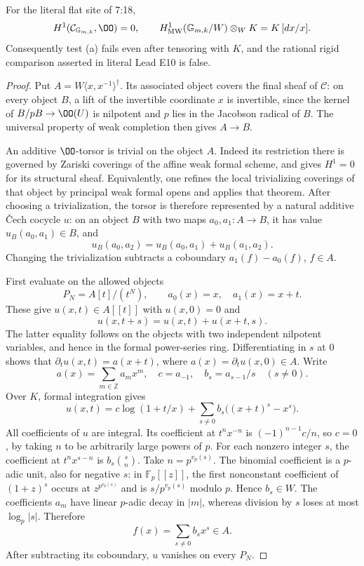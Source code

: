 \begin{theorem}\label{thm:DE-old-Gm}
For the literal flat site of 7:18,
\[
 H^1(\mathcal C_{\mathbb G_{m,k}},\OO)=0,
 \qquad
 H^1_{\rm MW}(\mathbb G_{m,k}/W)\otimes_WK
       =K\,[dx/x].
\]
Consequently test (a) fails even after tensoring with $K$, and the rational rigid comparison asserted in literal Lead E10 is false.
\end{theorem}
\begin{proof}
Put $A=W\langle x,x^{-1}\rangle^\dagger$.  Its associated object covers the final sheaf of $\mathcal C$: on every object $B$, a lift of the invertible coordinate $x$ is invertible, since the kernel of $B/pB\to\OO(U)$ is nilpotent and $p$ lies in the Jacobson radical of $B$.  The universal property of weak completion then gives $A\to B$.

An additive $\OO$-torsor is trivial on the object $A$.  Indeed its restriction there is governed by Zariski coverings of the affine weak formal scheme, and \cite[\S2, Theorem~14, p.~10]{Meredith1972} gives $H^1=0$ for its structural sheaf.  Equivalently, one refines the local trivializing coverings of that object by principal weak formal opens and applies that theorem.  After choosing a trivialization, the torsor is therefore represented by a natural additive \v Cech cocycle $u$: on an object $B$ with two maps $a_0,a_1:A\to B$, it has value $u_B(a_0,a_1)\in B$, and
\[
 u_B(a_0,a_2)=u_B(a_0,a_1)+u_B(a_1,a_2).
\]
Changing the trivialization subtracts a coboundary $a_1(f)-a_0(f)$, $f\in A$.

First evaluate on the allowed objects
\[
                P_N=A[t]/(t^N),\qquad
                a_0(x)=x,\quad a_1(x)=x+t.
\]
These give $u(x,t)\in A[[t]]$ with $u(x,0)=0$ and
\[
              u(x,t+s)=u(x,t)+u(x+t,s).
\]
The latter equality follows on the objects with two independent nilpotent variables, and hence in the formal power-series ring.  Differentiating in $s$ at $0$ shows that $\partial_tu(x,t)=a(x+t)$, where $a(x)=\partial_tu(x,0)\in A$.  Write
\[
 a(x)=\sum_{m\in\mathbb Z}a_mx^m,\quad
 c=a_{-1},\quad b_s=a_{s-1}/s\quad(s\ne0).
\]
Over $K$, formal integration gives
\[
 u(x,t)=c\log(1+t/x)+
       \sum_{s\ne0}b_s\bigl((x+t)^s-x^s\bigr).
\]
All coefficients of $u$ are integral.  Its coefficient at $t^nx^{-n}$ is $(-1)^{n-1}c/n$, so $c=0$, by taking $n$ to be arbitrarily large powers of $p$.  For each nonzero integer $s$, the coefficient at $t^nx^{s-n}$ is $b_s\binom{s}{n}$.  Take $n=p^{v_p(s)}$.  The binomial coefficient is a $p$-adic unit, also for negative $s$: in $\mathbb F_p[[z]]$, the first nonconstant coefficient of $(1+z)^s$ occurs at $z^{p^{v_p(s)}}$ and is $s/p^{v_p(s)}$ modulo $p$.  Hence $b_s\in W$.  The coefficients $a_m$ have linear $p$-adic decay in $|m|$, whereas division by $s$ loses at most $\log_p|s|$.  Therefore
\[
                         f(x)=\sum_{s\ne0}b_sx^s\in A.
\]
After subtracting its coboundary, $u$ vanishes on every $P_N$.


\end{proof}
